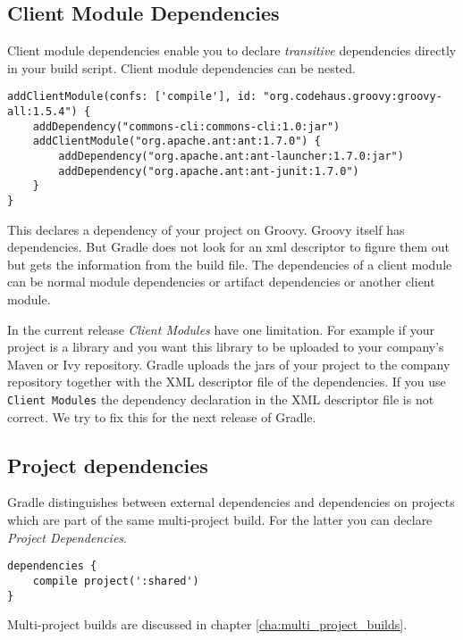 \subsection{Client Module Dependencies} %
\label{sub:client_module_dependencies}
Client module dependencies enable you to declare \emph{transitive} dependencies directly in your build script. Client module dependencies can be nested.
\begin{Verbatim}
addClientModule(confs: ['compile'], id: "org.codehaus.groovy:groovy-all:1.5.4") {
    addDependency("commons-cli:commons-cli:1.0:jar")
    addClientModule("org.apache.ant:ant:1.7.0") {
        addDependency("org.apache.ant:ant-launcher:1.7.0:jar")
        addDependency("org.apache.ant:ant-junit:1.7.0")
    }
}
\end{Verbatim}
This declares a dependency of your project on Groovy. Groovy itself has dependencies. But Gradle does not look for an xml descriptor to figure them out but gets the information from the build file. The dependencies of a client module can be normal module dependencies or artifact dependencies or another client module.

In the current release \emph{Client Modules} have one limitation. For example if your project is a library and you want this library to be uploaded to your company's Maven or Ivy repository. Gradle uploads the jars of your project to the company repository together with the XML descriptor file of the dependencies. If you use \texttt{Client Modules} the dependency declaration in the XML descriptor file is not correct. We try to fix this for the next release of Gradle.

\subsection{Project dependencies} %
\label{sub:project_dependencies}
Gradle distinguishes between external dependencies and dependencies on projects which are part of the same multi-project build. For the latter you can declare \emph{Project Dependencies}.
\begin{Verbatim}
dependencies {
    compile project(':shared')
}
\end{Verbatim}
Multi-project builds are discussed in chapter \ref{cha:multi_project_builds}.

